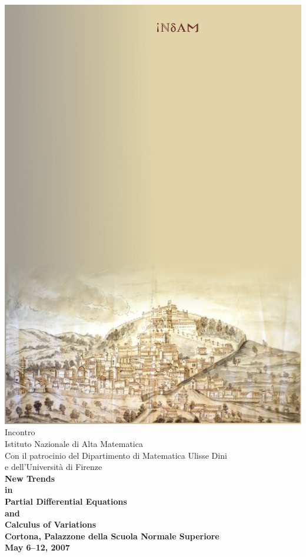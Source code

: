 \documentclass[a4paper]{article}
\newcommand{\buh}[1]{\textsf{#1}\\}
\begin{document}
\color{my}
\begin{center}
\includegraphics[scale=0.59]{sfondo}
\\
\vspace{-29cm}
\bigskip
\Huge
\buh{Incontro \phantom{INdAM}}
\large
\buh{Istituto Nazionale di Alta Matematica}
\medskip
\buh{Con il patrocinio del Dipartimento di Matematica Ulisse Dini}
\buh{e dell'Universit\`a di Firenze}
\bigskip
\bf
\Huge
\buh{New Trends}
\huge
\buh{in}
\Huge
\buh{Partial Differential Equations}
\huge
\buh{and}
\Huge
\buh{Calculus of Variations}

\bigskip
\Large
\buh{Cortona, Palazzone della Scuola Normale Superiore}
\buh{May 6--12, 2007}


\end{center}
\end{document}
